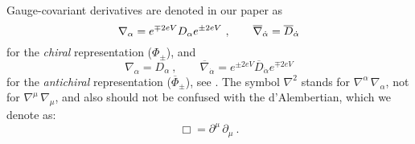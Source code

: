 \documentclass[12pt]{revtex4}
\begin{document}
Gauge-covariant derivatives are denoted in our paper as
\begin{equation*}
        \nabla_\alpha = e^{\mp 2eV} D_\alpha e^{\pm 2eV}~,
\qquad
        \overline{\nabla}_{\dot{\alpha}} = \overline{D}_{\dot{\alpha}} \\
\end{equation*}
	for the {\it chiral} representation ($ \Phi_\pm $), and 
\begin{equation*}
        \nabla_\alpha = D_\alpha~,
\qquad
        \overline{\nabla}_{\dot{\alpha}} = e^{\pm 2eV} \overline{D}_{\dot{\alpha}}
                                    e^{\mp 2eV}
\end{equation*}
	for the {\it antichiral} representation ($ \overline{\Phi}{}_\pm $), see
\cite{Gates:1983nr}.
The symbol $ \nabla^2 $ stands for $ \nabla^\alpha\, \nabla_\alpha $,
not for $ \nabla^\mu\, \nabla_\mu $, and also
should not be confused with the d'Alembertian, which we denote
as:
\[
\Box = \partial^\mu\, \partial_\mu~.
\]
\end{document}
